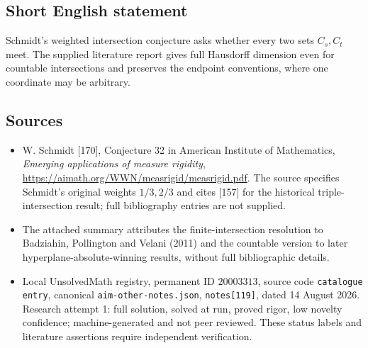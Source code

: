 \documentclass[11pt]{article}
\begin{document}
\subsection{Short English statement}
Schmidt's weighted intersection conjecture asks whether every two sets $C_s,C_t$ meet. The supplied literature report gives full Hausdorff dimension even for countable intersections and preserves the endpoint conventions, where one coordinate may be arbitrary.
\subsection{Sources}
\begin{itemize}
\item W. Schmidt [170], Conjecture 32 in American Institute of Mathematics, \emph{Emerging applications of measure rigidity}, \url{https://aimath.org/WWN/measrigid/measrigid.pdf}. The source specifies Schmidt's original weights $1/3,2/3$ and cites [157] for the historical triple-intersection result; full bibliography entries are not supplied.
\item The attached summary attributes the finite-intersection resolution to Badziahin, Pollington and Velani (2011) and the countable version to later hyperplane-absolute-winning results, without full bibliographic details.
\item Local UnsolvedMath registry, permanent ID $20003313$, source code \texttt{catalogue entry}, canonical \texttt{aim-other-notes.json}, \texttt{notes[119]}, dated 14 August 2026. Research attempt 1: full solution, solved at run, proved rigor, low novelty confidence; machine-generated and not peer reviewed. These status labels and literature assertions require independent verification.
\end{itemize}
\end{document}

